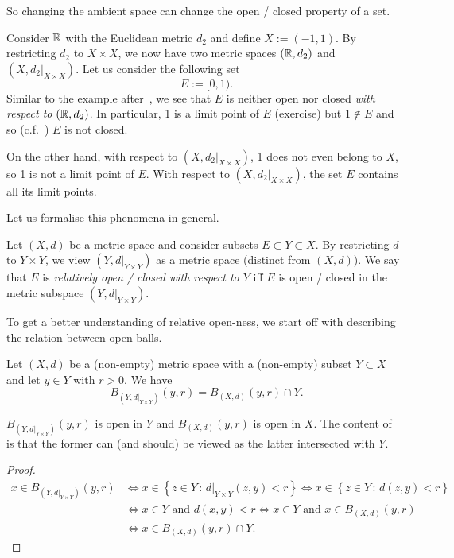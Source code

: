 So changing the ambient space can change the open / closed property of a set.
\begin{eg}[Subspaces of $\R$]
Consider $\R$ with the Euclidean metric $d_2$ and define $X := (-1,1)$. By restricting $d_2$ to $X\times X$, we now have two metric spaces $(\mathbb{R},d_2)$ and $(X, \left.d_2\right|_{X\times X})$. Let us consider the following set
\[
E:= [0,1).
\]
Similar to the example after~, we see that $E$ is neither open nor closed \textit{with respect to $(\mathbb{R},d_2)$}. In particular, 1 is a limit point of $E$ (exercise) but $1 \notin E$ and so (c.f.~) $E$ is not closed.

On the other hand, with respect to $(X,\left.d_2\right|_{X\times X})$, 1 does not even belong to $X$, so 1 is not a limit point of $E$. With respect to $(X,\left.d_2\right|_{X\times X})$, the set $E$ contains all its limit points.
\end{eg}
Let us formalise this phenomena in general.
\begin{defn}
\label{defn:rel_top}
Let $(X,d)$ be a metric space and consider subsets $E \subset Y \subset X$. By restricting $d$ to $Y\times Y$, we view $(Y,d|_{Y\times Y})$ as a metric space (distinct from $(X,d)$). We say that $E$ is \textit{relatively open / closed with respect to $Y$} iff $E$ is open / closed in the metric subspace $(Y,d|_{Y\times Y})$.
\end{defn}
To get a better understanding of relative open-ness, we start off with describing the relation between open balls.
\begin{lemma}
\label{lem:rel_ball}
Let $(X,d)$ be a (non-empty) metric space with a (non-empty) subset $Y\subset X$ and let $y \in Y$ with $r>0$. We have
\[
B_{(Y,d|_{Y\times Y})}(y,r) = B_{(X,d)}(y,r)\cap Y.
\]
\end{lemma}
$B_{(Y,d|_{Y\times Y})}(y,r)$ is open in $Y$ and $B_{(X,d)}(y,r)$ is open in $X$. The content of~ is that the former can (and should) be viewed as the latter intersected with $Y$.
\begin{proof}
\begin{align*}
x \in B_{(Y,d|_{Y\times Y})}(y,r) &\iff x\in \left\{
z \in Y \, : \, d|_{Y\times Y}(z,y)<r
\right\} \iff x\in \left\{
z \in Y \, : \, d(z,y)<r
\right\} 	\\
&\iff x \in Y \text{ and }d(x,y)<r 	\iff x \in Y\text{ and }x \in B_{(X,d)}(y,r) 	\\
&\iff x \in B_{(X,d)}(y,r) \cap Y.
\end{align*}
\end{proof}
